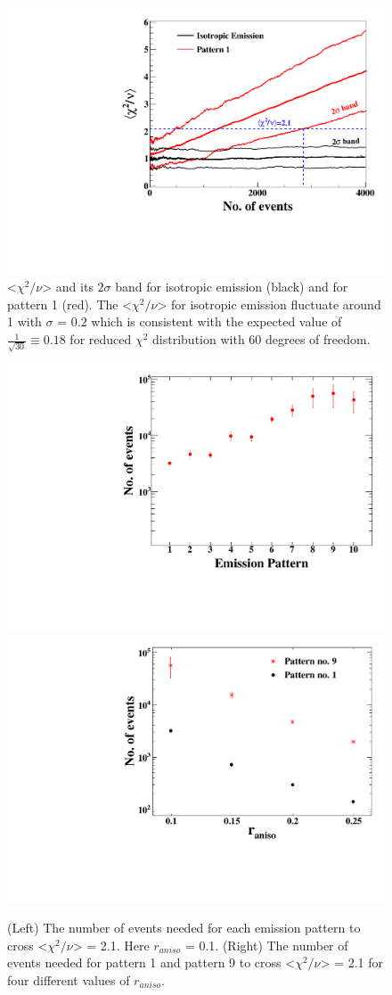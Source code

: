 \begin{figure}[h]
\centerline{\includegraphics[width=0.5\linewidth]{Pattern1.pdf}}
\caption{<$\chi^2/\nu$> and its $2\sigma$ band for isotropic emission (black) and for pattern 1 (red). The <$\chi^2/\nu$> for 
isotropic emission fluctuate around 1 with $\sigma$ = 0.2 which is consistent with 
the expected value of $\frac{1}{\sqrt{30}} \equiv 0.18$ for reduced $\chi^2$ distribution 
with 60 degrees of freedom.}
\label{fig:pattern1}
\end{figure}

\begin{figure}[h]
\centering
\includegraphics[width=0.45\linewidth]{ConvergenceVsPattern.pdf}
\hspace{0.1cm}
\includegraphics[width=0.45\linewidth]{ConvergenceVsRaniso.pdf}
\caption{(Left) The number of events needed for each emission pattern to cross <$\chi^2/\nu$> = 2.1. Here 
$r_{aniso}$ = 0.1. (Right) The number of events needed for pattern 1 and pattern 9 to cross <$\chi^2/\nu$> = 2.1 
for four different values of $r_{aniso}$.}
\label{fig:convergence}
\end{figure}



